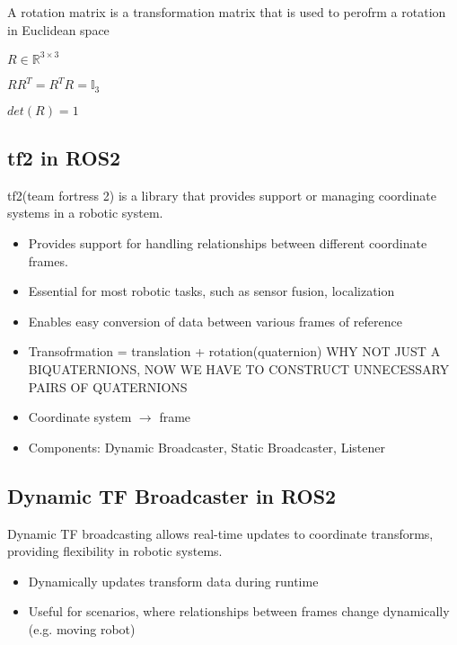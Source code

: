 A rotation matrix is a transformation matrix that is used to perofrm a rotation in Euclidean space
\begin{item}
    $R \in \mathbb{R}^{3\times 3}$ 
\item $R R^{T} = R^{T}R = \mathbb{I}_3$ 
\item $det(R) = 1$
\end{item}

\subsection{tf2 in ROS2}

tf2(team fortress 2) is a library that provides support or managing coordinate systems in a robotic system.
\begin{itemize}
        \item Provides support for handling relationships between different coordinate frames.
        \item Essential for most robotic tasks, such as sensor fusion, localization
        \item Enables easy conversion of data between various frames of reference
\end{itemize}

\begin{itemize}
        \item Transofrmation = translation + rotation(quaternion) WHY NOT JUST A BIQUATERNIONS, NOW WE HAVE TO CONSTRUCT UNNECESSARY PAIRS OF QUATERNIONS
        \item Coordinate system $\rightarrow $ frame
        \item Components: Dynamic Broadcaster, Static Broadcaster, Listener
\end{itemize}

\subsection{Dynamic TF Broadcaster in ROS2}

Dynamic TF broadcasting allows real-time updates to coordinate transforms, providing flexibility in robotic systems.
\begin{itemize}
        \item Dynamically updates transform data during runtime
        \item Useful for scenarios, where relationships between frames change dynamically (e.g. moving robot)

\end{itemize}

